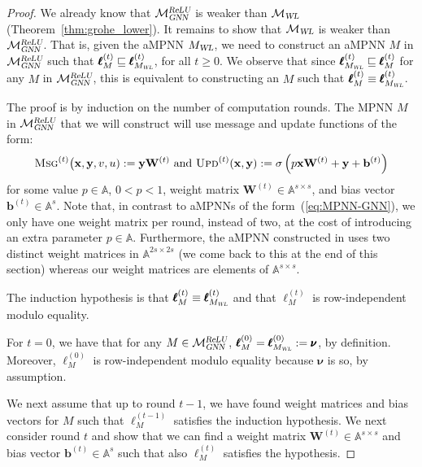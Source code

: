\begin{proof}
We already know that $\mathcal{M}_{\textsl{GNN}}^{\textsl{ReLU}}$ is weaker than $\mathcal{M}_{\textsl{WL}}$ (Theorem~\ref{thm:grohe_lower}). It remains to show that $\mathcal{M}_{\textsl{WL}}$ is weaker than $\mathcal{M}_{\textsl{GNN}}^{\textsl{ReLU}}$. That is, given the aMPNN $M_{\textsl{WL}}$, we need to construct an aMPNN $M$ in $\mathcal{M}_{\textsl{GNN}}^{\textsl{ReLU}}$ such that 
$\pmb{\ell}_{M}^{(t)}\sqsubseteq \pmb{\ell}_{M_{\textsl{WL}}}^{(t)}$, for all $t\geq 0$. We observe that
since $\pmb{\ell}_{M_{\textsl{WL}}}^{(t)}\sqsubseteq \pmb{\ell}_{M}^{(t)}$ for any $M$ in $\mathcal{M}_{\textsl{GNN}}^{\textsl{ReLU}}$, this is equivalent to constructing an $M$ such that $\pmb{\ell}_{M}^{(t)}\equiv \pmb{\ell}_{M_{\textsl{WL}}}^{(t)}$. 

The proof is by induction on the number of computation rounds. The MPNN $M$ in 
$\mathcal{M}_{\textsl{GNN}}^{\textsl{ReLU}}$ 
that we will construct will use message and update functions of the form:
\begin{equation}\textsc{Msg}^{(t)}\bigl(\mathbf{x},\mathbf{y},v,u):=\mathbf{y}\mathbf{W}^{(t)}
\text{ and } 
\textsc{Upd}^{(t)}(\mathbf{x},\mathbf{y}):=\sigma\left(p\mathbf{x}\mathbf{W}^{(t)}+\mathbf{y} + \mathbf{b}^{(t)}\right) \label{eq:MPNN-GNN-simple}
\end{equation}
for some value $p\in\mathbb{A}$, $0<p<1$, weight matrix $\mathbf{W}^{(t)}\in\mathbb{A}^{s\times s}$, and bias vector $\mathbf{b}^{(t)}\in\mathbb{A}^s$. Note that, in contrast to aMPNNs of the form~(\ref{eq:MPNN-GNN}), we only have one weight matrix per round, instead of two, at the cost of introducing an extra parameter $p\in\mathbb{A}$.  Furthermore, the aMPNN constructed in \cite{grohewl} uses two distinct weight matrices in $\mathbb{A}^{2s\times 2s}$ (we come back to this at the end of this section) whereas our weight matrices are elements of $\mathbb{A}^{s\times s}$.

The induction hypothesis is that $\pmb{\ell}^{(t)}_M\equiv \pmb{\ell}_{M_{\textsl{WL}}}^{(t)}$ and that $\pmb{\ell}^{(t)}_M$ is row-independent modulo equality.

For $t=0$, we have that for any $M\in \mathcal{M}_{\textsl{GNN}}^{\textsl{ReLU}}$, $\pmb{\ell}_M^{(0)}=\pmb{\ell}_{M_{\textsl{WL}}}^{(0)}:=\pmb{\nu}$, by definition.
Moreover, $\pmb{\ell}_M^{(0)}$ is row-independent modulo equality because $\pmb{\nu}$ is so, by assumption. 

We next assume that up to round $t-1$, we have found weight matrices and bias vectors for $M$ such that 
$\pmb{\ell}_M^{(t-1)}$ satisfies the induction hypothesis.
We next consider round $t$ and show that we can find a weight matrix $\mathbf{W}^{(t)}\in\mathbb{A}^{s\times s }$ and bias vector $\mathbf{b}^{(t)}\in\mathbb{A}^s$ such that also
$\pmb{\ell}_M^{(t)}$ satisfies the hypothesis.



\end{proof}
